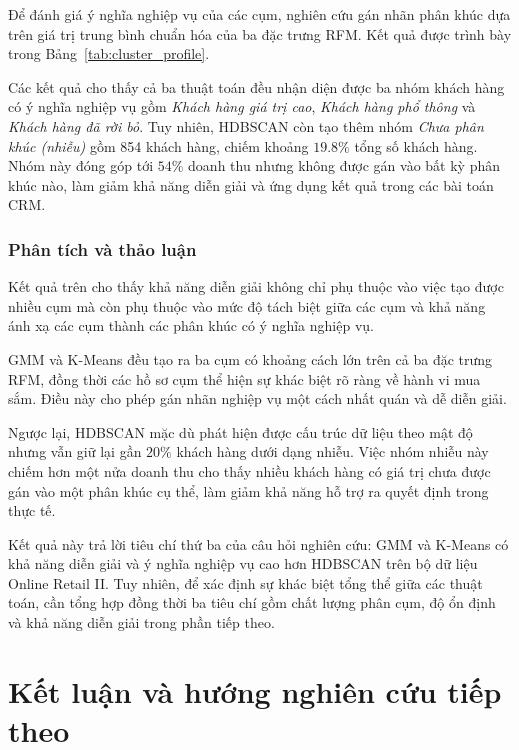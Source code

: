 \documentclass[12pt]{ai_conquer2026}
\begin{document}
Để đánh giá ý nghĩa nghiệp vụ của các cụm, nghiên cứu gán nhãn phân khúc dựa trên giá trị trung bình chuẩn hóa của ba đặc trưng RFM. Kết quả được trình bày trong Bảng~\ref{tab:cluster_profile}.


Các kết quả cho thấy cả ba thuật toán đều nhận diện được ba nhóm khách hàng có ý nghĩa nghiệp vụ gồm \textit{Khách hàng giá trị cao}, \textit{Khách hàng phổ thông} và \textit{Khách hàng đã rời bỏ}. Tuy nhiên, HDBSCAN còn tạo thêm nhóm \textit{Chưa phân khúc (nhiễu)} gồm 854 khách hàng, chiếm khoảng $19.8\%$ tổng số khách hàng. Nhóm này đóng góp tới $54\%$ doanh thu nhưng không được gán vào bất kỳ phân khúc nào, làm giảm khả năng diễn giải và ứng dụng kết quả trong các bài toán CRM.

\subsubsection{Phân tích và thảo luận}

Kết quả trên cho thấy khả năng diễn giải không chỉ phụ thuộc vào việc tạo được nhiều cụm mà còn phụ thuộc vào mức độ tách biệt giữa các cụm và khả năng ánh xạ các cụm thành các phân khúc có ý nghĩa nghiệp vụ.

GMM và K-Means đều tạo ra ba cụm có khoảng cách lớn trên cả ba đặc trưng RFM, đồng thời các hồ sơ cụm thể hiện sự khác biệt rõ ràng về hành vi mua sắm. Điều này cho phép gán nhãn nghiệp vụ một cách nhất quán và dễ diễn giải.

Ngược lại, HDBSCAN mặc dù phát hiện được cấu trúc dữ liệu theo mật độ nhưng vẫn giữ lại gần $20\%$ khách hàng dưới dạng nhiễu. Việc nhóm nhiễu này chiếm hơn một nửa doanh thu cho thấy nhiều khách hàng có giá trị chưa được gán vào một phân khúc cụ thể, làm giảm khả năng hỗ trợ ra quyết định trong thực tế.

Kết quả này trả lời tiêu chí thứ ba của câu hỏi nghiên cứu: GMM và K-Means có khả năng diễn giải và ý nghĩa nghiệp vụ cao hơn HDBSCAN trên bộ dữ liệu Online Retail II. Tuy nhiên, để xác định sự khác biệt tổng thể giữa các thuật toán, cần tổng hợp đồng thời ba tiêu chí gồm chất lượng phân cụm, độ ổn định và khả năng diễn giải trong phần tiếp theo.

\section{Kết luận và hướng nghiên cứu tiếp theo}
\end{document}
